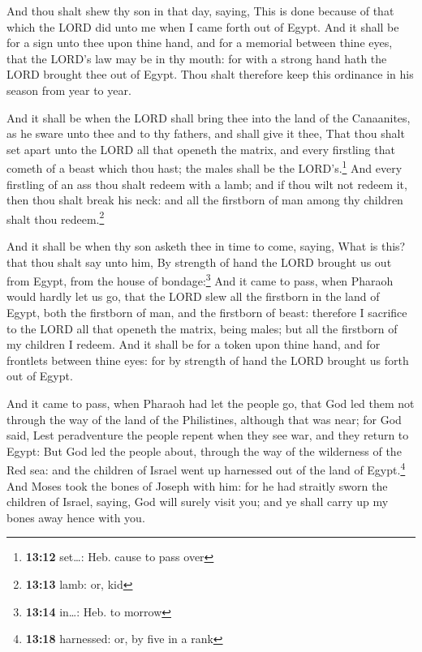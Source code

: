  And thou shalt shew thy son in that day, saying, This is
done because of that which the LORD did unto me when I came forth out of
Egypt.  And it shall be for a sign unto thee upon thine
hand, and for a memorial between thine eyes, that the LORD's law may be
in thy mouth: for with a strong hand hath the LORD brought thee out of
Egypt.  Thou shalt therefore keep this ordinance in his
season from year to year.

 And it shall be when the LORD shall bring thee into the
land of the Canaanites, as he sware unto thee and to thy fathers, and
shall give it thee,  That thou shalt set apart unto the
LORD all that openeth the matrix, and every firstling that cometh of a
beast which thou hast; the males shall be the LORD's.\footnote{\textbf{13:12}
  set\ldots: Heb. cause to pass over}  And every
firstling of an ass thou shalt redeem with a lamb; and if thou wilt not
redeem it, then thou shalt break his neck: and all the firstborn of man
among thy children shalt thou redeem.\footnote{\textbf{13:13} lamb: or,
  kid}

 And it shall be when thy son asketh thee in time to
come, saying, What is this? that thou shalt say unto him, By strength of
hand the LORD brought us out from Egypt, from the house of
bondage:\footnote{\textbf{13:14} in\ldots: Heb. to morrow}
 And it came to pass, when Pharaoh would hardly let us
go, that the LORD slew all the firstborn in the land of Egypt, both the
firstborn of man, and the firstborn of beast: therefore I sacrifice to
the LORD all that openeth the matrix, being males; but all the firstborn
of my children I redeem.  And it shall be for a token
upon thine hand, and for frontlets between thine eyes: for by strength
of hand the LORD brought us forth out of Egypt.

 And it came to pass, when Pharaoh had let the people go,
that God led them not through the way of the land of the Philistines,
although that was near; for God said, Lest peradventure the people
repent when they see war, and they return to Egypt:  But
God led the people about, through the way of the wilderness of the Red
sea: and the children of Israel went up harnessed out of the land of
Egypt.\footnote{\textbf{13:18} harnessed: or, by five in a rank}
 And Moses took the bones of Joseph with him: for he had
straitly sworn the children of Israel, saying, God will surely visit
you; and ye shall carry up my bones away hence with you.

